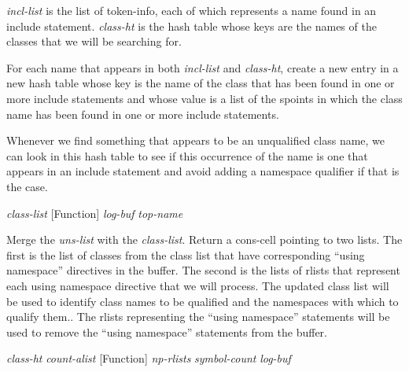 \begin{doc-string}
\emph{incl-list} is the list of token-info, each of which represents a name found in
an include statement.  \emph{class-ht} is the hash table whose keys are the names of
the classes that we will be searching for.

For each name that appears in both \emph{incl-list} and \emph{class-ht}, create a new entry in
a new hash table whose key is the name of the class that has been found in one
or more include statements and whose value is a list of the spoints in which the
class name has been found in one or more include statements.

Whenever we find something that appears to be an unqualified class name, we can
look in this hash table to see if this occurrence of the name is one that
appears in an include statement and avoid adding a namespace qualifier if that
is the case.
\end{doc-string}

\vspace{1em}
\noindent
{}
\usebox{\funcname}\emph{class-list}
 \hfill [Function]
\hspace*{\wd\funcname}\emph{log-buf}
\hspace*{\wd\funcname}\emph{top-name}

\begin{doc-string}
Merge the \emph{uns-list} with the \emph{class-list}.  Return a cons-cell pointing to two
lists.  The first is the list of classes from the class list that have
corresponding ``using namespace'' directives in the buffer.  The second is the
lists of rlists that represent each using namespace directive that we will
process.
The updated class list will be used to identify class names to be qualified and
the namespaces with which to qualify them..  The rlists representing the ``using
namespace'' statements will be used to remove the ``using namespace'' statements
from the buffer.
\end{doc-string}

\vspace{1em}
\noindent
{}
\usebox{\funcname}\emph{class-ht} \emph{count-alist}
 \hfill [Function]
\hspace*{\wd\funcname}\emph{np-rlists}
\hspace*{\wd\funcname}\emph{symbol-count} \emph{log-buf}

